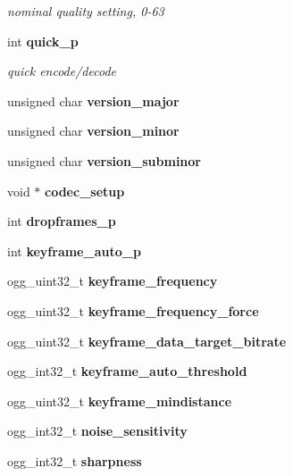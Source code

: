 \begin{CompactItemize}
\begin{CompactList}\small\item\em nominal quality setting, 0-63 \item\end{CompactList}\item 
int {\bf quick\_\-p}\label{structtheora__info_o13}

\begin{CompactList}\small\item\em quick encode/decode \item\end{CompactList}\item 
unsigned char {\bf version\_\-major}\label{structtheora__info_o14}

\item 
unsigned char {\bf version\_\-minor}\label{structtheora__info_o15}

\item 
unsigned char {\bf version\_\-subminor}\label{structtheora__info_o16}

\item 
void $\ast$ {\bf codec\_\-setup}\label{structtheora__info_o17}

\item 
int {\bf dropframes\_\-p}\label{structtheora__info_o18}

\item 
int {\bf keyframe\_\-auto\_\-p}\label{structtheora__info_o19}

\item 
ogg\_\-uint32\_\-t {\bf keyframe\_\-frequency}\label{structtheora__info_o20}

\item 
ogg\_\-uint32\_\-t {\bf keyframe\_\-frequency\_\-force}\label{structtheora__info_o21}

\item 
ogg\_\-uint32\_\-t {\bf keyframe\_\-data\_\-target\_\-bitrate}\label{structtheora__info_o22}

\item 
ogg\_\-int32\_\-t {\bf keyframe\_\-auto\_\-threshold}\label{structtheora__info_o23}

\item 
ogg\_\-uint32\_\-t {\bf keyframe\_\-mindistance}\label{structtheora__info_o24}

\item 
ogg\_\-int32\_\-t {\bf noise\_\-sensitivity}\label{structtheora__info_o25}

\item 
ogg\_\-int32\_\-t {\bf sharpness}\label{structtheora__info_o26}

\end{CompactItemize}



